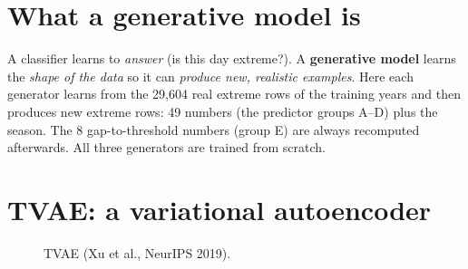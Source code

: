 \section{What a generative model is}
A classifier learns to \emph{answer} (is this day extreme?). A \textbf{generative model} learns the \emph{shape of the
data} so it can \emph{produce new, realistic examples}. Here each generator learns from the 29{,}604 real extreme rows of
the training years and then produces new extreme rows: 49 numbers (the predictor groups A--D) plus the season. The 8
gap-to-threshold numbers (group E) are always recomputed afterwards. All three generators are trained from scratch.

\section{TVAE: a variational autoencoder}
\begin{figure}[H]
\centering
{}
\caption{TVAE (Xu et al., NeurIPS 2019).}
\end{figure}
